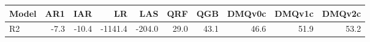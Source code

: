 \begin{tabular}{lrrrrrrrrr}
\toprule
Model & AR1 & IAR & LR & LAS & QRF & QGB & DMQv0c & DMQv1c & DMQv2c \\
\midrule
R2 & -7.3 & -10.4 & -1141.4 & -204.0 & 29.0 & 43.1 & 46.6 & 51.9 & 53.2 \\
\bottomrule
\end{tabular}

